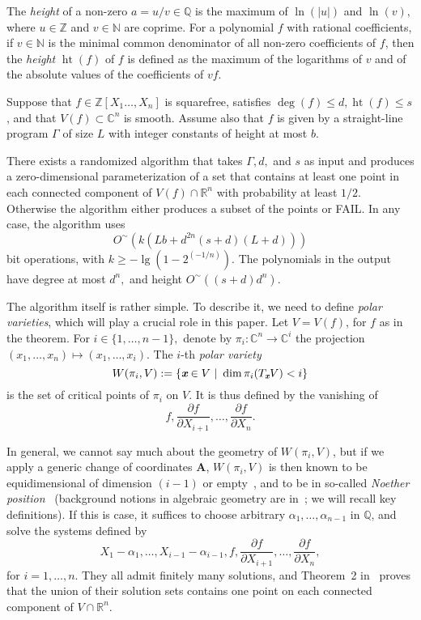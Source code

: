 \documentclass[sigconf]{acmart}
\def\mA{{\bm A}}
\def\xb{\textit{\textbf{x}}}
\DeclareMathOperator{\htt}{ht}
\def\C{\mathbb{C}}
\def\Q{\mathbb{Q}}
\def\R{\mathbb{R}}
\def\pa{\partial}
\newcommand{\ZZ}{{\mathbb{Z}}}
\begin{document}
The {\em height} of a non-zero $a=u/v \in \Q$ is the maximum of
$\ln(|u|)$ and $\ln(v),$ where $u \in \mathbb{Z}$ and $v \in
\mathbb{N}$ are coprime. For a polynomial $f$ with rational
coefficients, if $v \in \mathbb N$ is the minimal common denominator
of all non-zero coefficients of $f$, then the \textit{height}
$\htt(f)$ of $f$ is defined as the maximum of the logarithms of $v$
and of the absolute values of the coefficients of $vf$.

\begin{theorem}\label{theo:main}
  Suppose that $f\in\ZZ[X_1\hdots,X_n]$ is squarefree, satisfies
  $\deg(f) \leq d, \htt(f) \leq s$, and that $V(f) \subset \C^n$ is
  smooth.  Assume also that $f$ is given by a straight-line program
  $\Gamma$ of size $L$ with integer constants of height at most $b.$

  There exists a randomized algorithm that takes $\Gamma, d,$ and $s$
  as input and produces a zero-dimensional parameterization of a set
  that contains at least one point in each connected component of
  $V(f) \cap \R^n$ with probability at least $1/2$. Otherwise the
  algorithm either produces a subset of the points or FAIL. In any
  case, the algorithm uses
  \[
  O^{\sim}(k(Lb+d^{2n}(s+d)(L+d)))
  \]
  bit operations, with $k \geq -\lg(1-2^{(-1/n)})$. The polynomials in
  the output have degree at most $d^n,$ and height $
  O^{\sim}((s+d)d^n).$
\end{theorem}
The algorithm itself is rather simple. To describe it, we need to
define {\em polar varieties}, which will play a crucial role in this
paper. Let $V=V(f)$, for $f$ as in the theorem. For $i \in
\{1,\hdots,n-1\},$ denote by $\pi_i:\C^n \rightarrow \C^i$ the
projection $(x_1,\hdots,x_n) \mapsto (x_1,\hdots,x_i)$.  The $i$-th
\textit{polar variety} \[W(\pi_i,V) := \{\xb \in V~|~\dim \pi_i(T_\xb
V) < i\}\] is the set of critical points of $\pi_i$ on $V$.  It is
thus defined by the vanishing of \[f,\frac{\pa f}{\pa
  X_{i+1}},\hdots,\frac{\pa f}{\pa X_n}.\]

In general, we cannot say much about the geometry of
$W(\pi_i,V)$, but if we apply a generic change of coordinates $\mA$,
$W(\pi_i,V)$ is then known to be equidimensional of dimension $(i-1)$
or empty~\cite{BaGiHeMb97}, and to be in so-called {\em Noether
  position}~\cite{EMP} (background notions in algebraic geometry are
in~\cite{Mumford76,Shafarevich77,ECA}; we will recall key
definitions). If this is case, it suffices to choose arbitrary
$\alpha_1,\dots,\alpha_{n-1}$ in $\Q$, and solve the systems defined
by
\begin{equation}\label{eq:syst}
X_1-\alpha_1,\dots,X_{i-1}-\alpha_{i-1}, f, \frac{\pa f}{\pa
  X_{i+1}} ,\dots,\frac{\pa f}{\pa X_n},  
\end{equation}
for $i=1,\dots,n$.  They all admit finitely many solutions, and
Theorem~2 in~\cite{EMP} proves that the union of their solution sets
contains one point on each connected component of $V \cap \R^n$.
\end{document}
